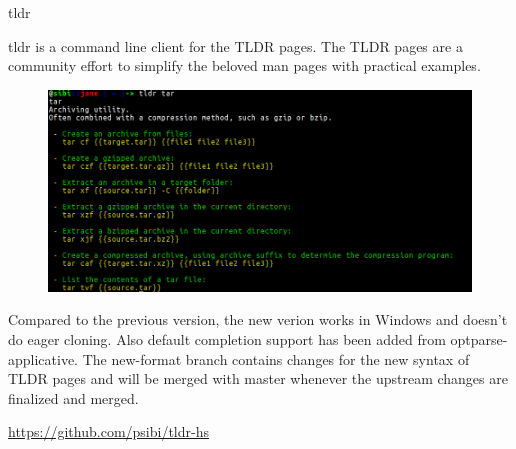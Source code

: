\documentclass[DIV16,twocolumn,10pt]{scrreprt}
\begin{document}
\begin{hcarentry}{tldr}
\makeheader

tldr is a command line client for the TLDR pages. The TLDR pages are a
community effort to simplify the beloved man pages with practical
examples.

\begin{figure}[h!]
  \includegraphics[width=\linewidth]{tldr.png}
  \label{fig:tldr-client}
\end{figure}

Compared to the previous version, the new verion works in Windows and
doesn't do eager cloning. Also default completion support has been
added from optparse-applicative. The new-format branch contains
changes for the new syntax of TLDR pages and will be merged with
master whenever the upstream changes are finalized and merged.

\FurtherReading
  \url{https://github.com/psibi/tldr-hs}
\end{hcarentry}
\end{document}
